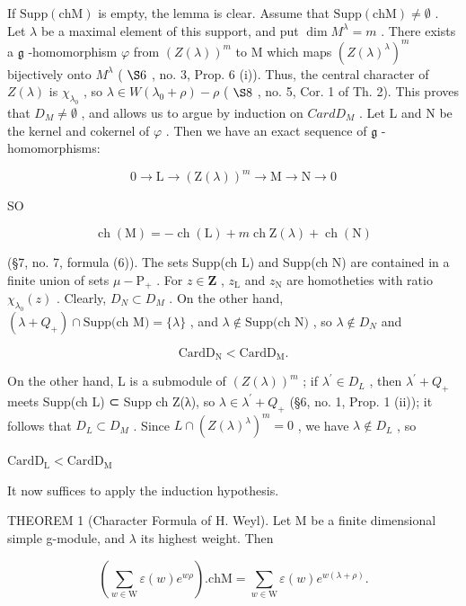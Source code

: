 If \(\mathrm{Supp(chM)}\) is empty, the lemma is clear. Assume that \(\mathrm{Supp(chM)} \neq \emptyset\) . Let \(\lambda\) be a maximal element of this support, and put \(\dim M^{\lambda} = m\) . There exists a \(\mathfrak{g}\) -homomorphism \(\varphi\) from \((Z(\lambda))^{m}\) to M which maps \((Z(\lambda)^{\lambda})^{m}\) bijectively onto \(M^{\lambda}\) ( \(\S 6\) , no. 3, Prop. 6 (i)). Thus, the central character of \(Z(\lambda)\) is \(\chi_{\lambda_0}\) , so \(\lambda \in W(\lambda_0 + \rho) - \rho\) ( \(\S 8\) , no. 5, Cor. 1 of Th. 2). This proves that \(D_M \neq \emptyset\) , and allows us to argue by induction on \(CardD_M\) . Let L and N be the kernel and cokernel of \(\varphi\) . Then we have an exact sequence of \(\mathfrak{g}\) -homomorphisms:

\[
0 \to \mathrm{L} \to (\mathrm{Z} (\lambda)) ^ {m} \to \mathrm{M} \to \mathrm{N} \to 0
\]

SO

\[
\operatorname{ch} (\mathrm{M}) = - \operatorname{ch} (\mathrm{L}) + m \operatorname{ch} \mathrm{Z} (\lambda) + \operatorname{ch} (\mathrm{N})
\]

(§7, no. 7, formula (6)). The sets Supp(ch L) and Supp(ch N) are contained in a finite union of sets \(\mu -\mathrm{P}_{+}\) . For \(z\in \mathbf{Z}\) , \(z_{\mathrm{L}}\) and \(z_{\mathrm{N}}\) are homotheties with ratio \(\chi_{\lambda_{0}}(z)\) . Clearly, \(D_{N} \subset D_{M}\) . On the other hand, \((\lambda + Q_{+}) \cap \text{Supp(ch M)} = \{\lambda\}\) , and \(\lambda \notin \text{Supp(ch N)}\) , so \(\lambda \notin D_{N}\) and

\[
\mathrm{Card} \mathrm{D} _ {\mathrm{N}} <   \mathrm{Card} \mathrm{D} _ {\mathrm{M}}.
\]

On the other hand, L is a submodule of \((Z(\lambda))^{m}\) ; if \(\lambda^{\prime} \in D_{L}\) , then \(\lambda^{\prime} + Q_{+}\) meets Supp(ch L) ⊂ Supp ch Z(λ), so \(\lambda \in \lambda^{\prime} + Q_{+}\) (§6, no. 1, Prop. 1 (ii)); it follows that \(D_{L} \subset D_{M}\) . Since \(L \cap (Z(\lambda)^{\lambda})^{m} = 0\) , we have \(\lambda \notin D_{L}\) , so

\(\mathrm{CardD_L} <   \mathrm{CardD_M}\)

It now suffices to apply the induction hypothesis.

THEOREM 1 (Character Formula of H. Weyl). Let M be a finite dimensional simple g-module, and \(\lambda\) its highest weight. Then

\[
\left(\sum_ {w \in \mathrm{W}} \varepsilon (w) e ^ {w \rho}\right). \mathrm{chM} = \sum_ {w \in \mathrm{W}} \varepsilon (w) e ^ {w (\lambda + \rho)}.
\]

